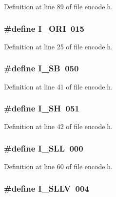 Definition at line 89 of file encode.\+h.

\subsubsection[{I\+\_\+\+O\+RI}]{\setlength{\rightskip}{0pt plus 5cm}\#define I\+\_\+\+O\+RI~015}\label{encode_8h_a417d4abf3452c8c3a9399e1ce4c4bf1e}


Definition at line 25 of file encode.\+h.

\subsubsection[{I\+\_\+\+SB}]{\setlength{\rightskip}{0pt plus 5cm}\#define I\+\_\+\+SB~050}\label{encode_8h_acbf3ba5e40636844d27fa2f1201bc2a7}


Definition at line 41 of file encode.\+h.

\subsubsection[{I\+\_\+\+SH}]{\setlength{\rightskip}{0pt plus 5cm}\#define I\+\_\+\+SH~051}\label{encode_8h_a7434ab3ddf6c278d30dd38350514f650}


Definition at line 42 of file encode.\+h.

\subsubsection[{I\+\_\+\+S\+LL}]{\setlength{\rightskip}{0pt plus 5cm}\#define I\+\_\+\+S\+LL~000}\label{encode_8h_af6d8dd2b80537b616c1a349969f88380}


Definition at line 60 of file encode.\+h.

\subsubsection[{I\+\_\+\+S\+L\+LV}]{\setlength{\rightskip}{0pt plus 5cm}\#define I\+\_\+\+S\+L\+LV~004}\label{encode_8h_a8d8c06d82256c78ead8c1ba75ebff3fb}


